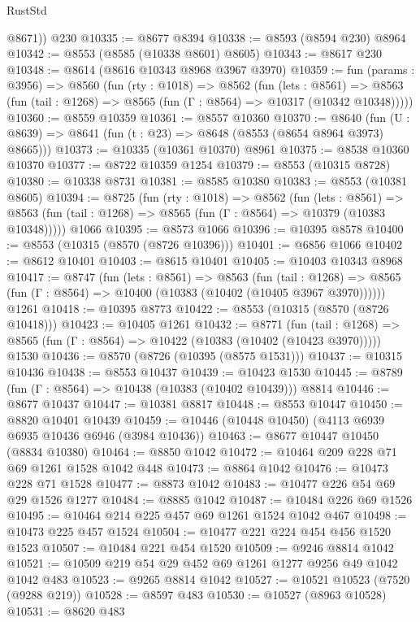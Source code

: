 \begin{lexlean}{RustStd}
\begin{coremodule}
        @8671))
    @230
@10335 := @8677 @8394
@10338 := @8593 (@8594 @230) @8964
@10342 := @8553 (@8585 (@10338 @8601) @8605)
@10343 := @8617 @230
@10348 := @8614 (@8616 @10343 @8968 @3967 @3970)
@10359 := fun (params : @3956) =>
  @8560
    (fun (rty : @1018) =>
    @8562
      (fun (lets : @8561) =>
      @8563 (fun (tail : @1268) => @8565 (fun (Γ : @8564) => @10317 (@10342 @10348)))))
@10360 := @8559 @10359
@10361 := @8557 @10360
@10370 := @8640
    (fun (U : @8639) => @8641 (fun (t : @23) => @8648 (@8553 (@8654 @8964 @3973) @8665)))
@10373 := @10335 (@10361 @10370) @8961
@10375 := @8538 @10360 @10370
@10377 := @8722 @10359 @1254
@10379 := @8553 (@10315 @8728)
@10380 := @10338 @8731
@10381 := @8585 @10380
@10383 := @8553 (@10381 @8605)
@10394 := @8725
    (fun (rty : @1018) =>
    @8562
      (fun (lets : @8561) =>
      @8563 (fun (tail : @1268) => @8565 (fun (Γ : @8564) => @10379 (@10383 @10348)))))
    @1066
@10395 := @8573 @1066
@10396 := @10395 @8578
@10400 := @8553 (@10315 (@8570 (@8726 @10396)))
@10401 := @6856 @1066
@10402 := @8612 @10401
@10403 := @8615 @10401
@10405 := @10403 @10343 @8968
@10417 := @8747
    (fun (lets : @8561) =>
    @8563
      (fun (tail : @1268) =>
      @8565 (fun (Γ : @8564) => @10400 (@10383 (@10402 (@10405 @3967 @3970))))))
    @1261
@10418 := @10395 @8773
@10422 := @8553 (@10315 (@8570 (@8726 @10418)))
@10423 := @10405 @1261
@10432 := @8771
    (fun (tail : @1268) => @8565 (fun (Γ : @8564) => @10422 (@10383 (@10402 (@10423 @3970)))))
    @1530
@10436 := @8570 (@8726 (@10395 (@8575 @1531)))
@10437 := @10315 @10436
@10438 := @8553 @10437
@10439 := @10423 @1530
@10445 := @8789 (fun (Γ : @8564) => @10438 (@10383 (@10402 @10439))) @8814
@10446 := @8677 @10437
@10447 := @10381 @8817
@10448 := @8553 @10447
@10450 := @8820 @10401 @10439
@10459 := @10446 (@10448 @10450) (@4113 @6939 @6935 @10436 @6946 (@3984 @10436))
@10463 := @8677 @10447 @10450 (@8834 @10380)
@10464 := @8850 @1042
@10472 := @10464 @209 @228 @71 @69 @1261 @1528 @1042 @448
@10473 := @8864 @1042
@10476 := @10473 @228 @71 @1528
@10477 := @8873 @1042
@10483 := @10477 @226 @54 @69 @29 @1526 @1277
@10484 := @8885 @1042
@10487 := @10484 @226 @69 @1526
@10495 := @10464 @214 @225 @457 @69 @1261 @1524 @1042 @467
@10498 := @10473 @225 @457 @1524
@10504 := @10477 @221 @224 @454 @456 @1520 @1523
@10507 := @10484 @221 @454 @1520
@10509 := @9246 @8814 @1042
@10521 := @10509 @219 @54 @29 @452 @69 @1261 @1277 @9256 @49 @1042 @1042 @483
@10523 := @9265 @8814 @1042
@10527 := @10521 @10523 (@7520 (@9288 @219))
@10528 := @8597 @483
@10530 := @10527 (@8963 @10528)
@10531 := @8620 @483

\end{coremodule}
\end{lexlean}
